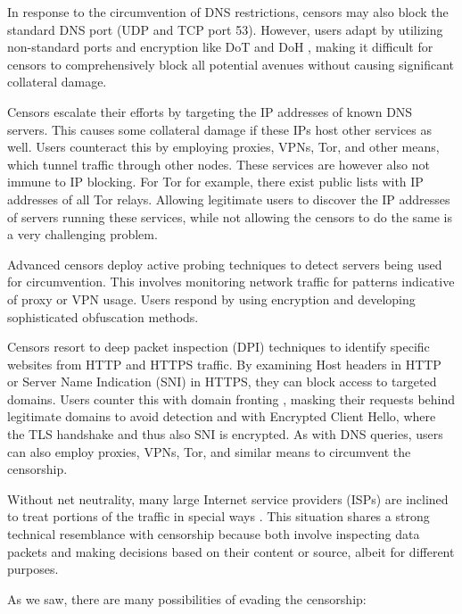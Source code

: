 In response to the circumvention of DNS restrictions, censors may also block the standard DNS port (UDP and TCP port 53).
However, users adapt by utilizing non-standard ports \cite{dns-nonstandard-port} and encryption like DoT \cite{RFC7858} and DoH \cite{RFC8484}, making it difficult for censors to comprehensively block all potential avenues without causing significant collateral damage.

Censors escalate their efforts by targeting the IP addresses of known DNS servers.
This causes some collateral damage if these IPs host other services as well.
Users counteract this by employing proxies, VPNs, Tor, and other means, which tunnel traffic through other nodes.
These services are however also not immune to IP blocking.
For Tor for example, there exist public lists with IP addresses of all Tor relays.
Allowing legitimate users to discover the IP addresses of servers running these services, while not allowing the censors to do the same is a very challenging problem.

Advanced censors deploy active probing techniques to detect servers being used for circumvention.
This involves monitoring network traffic for patterns indicative of proxy or VPN usage.
Users respond by using encryption and developing sophisticated obfuscation methods.

Censors resort to deep packet inspection (DPI) techniques to identify specific websites from HTTP and HTTPS traffic.
By examining Host headers in HTTP or Server Name Indication (SNI) in HTTPS, they can block access to targeted domains.
Users counter this with domain fronting \cite{Domain_fronting}, masking their requests behind legitimate domains to avoid detection and with Encrypted Client Hello, where the TLS handshake and thus also SNI is encrypted.
As with DNS queries, users can also employ proxies, VPNs, Tor, and similar means to circumvent the censorship.

Without net neutrality, many large Internet service providers (ISPs) are inclined to treat portions of the traffic in special ways \cite{Net_neutrality}.
This situation shares a strong technical resemblance with censorship because both involve inspecting data packets and making decisions based on their content or source, albeit for different purposes.

As we saw, there are many possibilities of evading the censorship:

